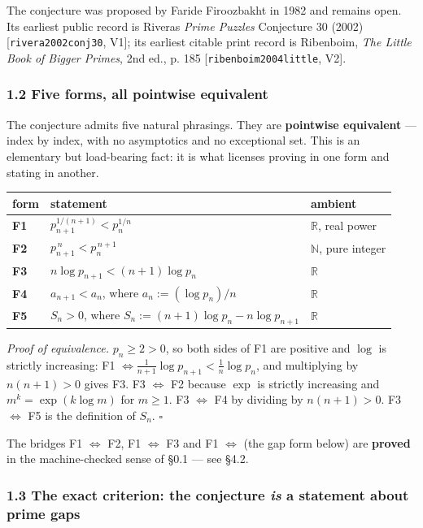 \documentclass[
  a4paper,
  11pt]{article}
\begin{document}
The conjecture was proposed by Faride Firoozbakht in 1982 and remains
open. Its earliest public record is Rivera\textquotesingle s \emph{Prime
Puzzles} Conjecture 30 (2002) {[}\texttt{rivera2002conj30}, V1{]}; its
earliest citable print record is Ribenboim, \emph{The Little Book of
Bigger Primes}, 2nd ed., p. 185 {[}\texttt{ribenboim2004little}, V2{]}.

\subsubsection{1.2 Five forms, all pointwise
equivalent}\label{12-five-forms-all-pointwise-equivalent}

The conjecture admits five natural phrasings. They are \textbf{pointwise
equivalent} --- index by index, with no asymptotics and no exceptional
set. This is an elementary but load-bearing fact: it is what licenses
proving in one form and stating in another.

\begin{longtable}[]{@{}lll@{}}
\toprule\noalign{}
form & statement & ambient \\
\midrule\noalign{}
\endhead
\bottomrule\noalign{}
\endlastfoot
\textbf{F1} & \(p_{n+1}^{1/(n+1)} < p_n^{1/n}\) & \(\mathbb{R}\), real
power \\
\textbf{F2} & \(p_{n+1}^{\,n} < p_n^{\,n+1}\) & \(\mathbb{N}\), pure
integer \\
\textbf{F3} & \(n\log p_{n+1} < (n+1)\log p_n\) & \(\mathbb{R}\) \\
\textbf{F4} & \(a_{n+1} < a_n\), where \(a_n := (\log p_n)/n\) &
\(\mathbb{R}\) \\
\textbf{F5} & \(S_n > 0\), where
\(S_n := (n+1)\log p_n - n\log p_{n+1}\) & \(\mathbb{R}\) \\
\end{longtable}

\emph{Proof of equivalence.} \(p_n \ge 2 > 0\), so both sides of F1 are
positive and \(\log\) is strictly increasing: F1
\(\iff \tfrac{1}{n+1}\log p_{n+1} < \tfrac{1}{n}\log p_n\), and
multiplying by \(n(n+1) > 0\) gives F3. F3 \(\iff\) F2 because \(\exp\)
is strictly increasing and \(m^k = \exp(k \log m)\) for \(m \ge 1\). F3
\(\iff\) F4 by dividing by \(n(n+1) > 0\). F3 \(\iff\) F5 is the
definition of \(S_n\). \(\square\)

The bridges F1 \(\iff\) F2, F1 \(\iff\) F3 and F1 \(\iff\) (the gap form
below) are \textbf{proved} in the machine-checked sense of §0.1 --- see
§4.2.

\subsubsection{\texorpdfstring{1.3 The exact criterion: the conjecture
\emph{is} a statement about prime
gaps}{1.3 The exact criterion: the conjecture is a statement about prime gaps}}\label{13-the-exact-criterion-the-conjecture-is-a-statement-about-prime-gaps}
\end{document}
